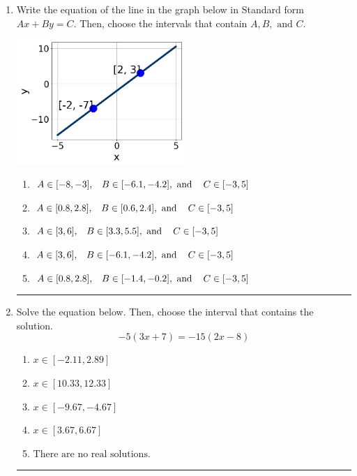 \documentclass[14pt]{extbook}
\newcommand{\litem}[1]{\item#1\hspace*{-1cm}\rule{\textwidth}{0.4pt}}
\begin{document}
\begin{enumerate}
{\begin{enumerate}[label=\Alph*.]
\end{enumerate} }
\litem{
Write the equation of the line in the graph below in Standard form $Ax+By=C$. Then, choose the intervals that contain $A, B, \text{ and } C$.
\begin{center}
    \includegraphics[width=0.5\textwidth]{../Figures/linearGraphToStandardCopyA.png}
\end{center}
\begin{enumerate}[label=\Alph*.]
\item \( A \in [-8, -3], \hspace{3mm} B \in [-6.1, -4.2], \text{ and } \hspace{3mm} C \in [-3, 5] \)
\item \( A \in [0.8, 2.8], \hspace{3mm} B \in [0.6, 2.4], \text{ and } \hspace{3mm} C \in [-3, 5] \)
\item \( A \in [3, 6], \hspace{3mm} B \in [3.3, 5.5], \text{ and } \hspace{3mm} C \in [-3, 5] \)
\item \( A \in [3, 6], \hspace{3mm} B \in [-6.1, -4.2], \text{ and } \hspace{3mm} C \in [-3, 5] \)
\item \( A \in [0.8, 2.8], \hspace{3mm} B \in [-1.4, -0.2], \text{ and } \hspace{3mm} C \in [-3, 5] \)

\end{enumerate} }
\litem{
Solve the equation below. Then, choose the interval that contains the solution.\[ -5(3x + 7) = -15(2x -8) \]\begin{enumerate}[label=\Alph*.]
\item \( x \in [-2.11, 2.89] \)
\item \( x \in [10.33, 12.33] \)
\item \( x \in [-9.67, -4.67] \)
\item \( x \in [3.67, 6.67] \)
\item \( \text{There are no real solutions.} \)


\end{enumerate}}
\end{enumerate}
\end{document}

